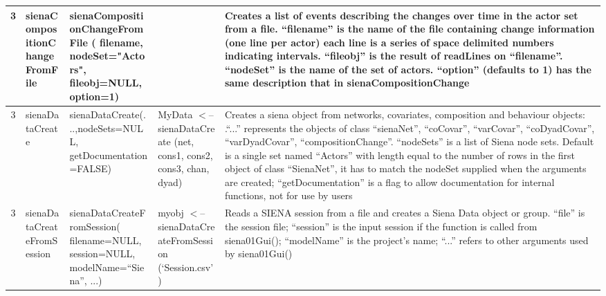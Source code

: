 \documentclass[a4paper,fleqn,11pt]{article}
\newcommand{\+}{\, + \,}
\begin{document}
{\begin{landscape}
\begin{small}
\begin{longtable}{c | p{2.4cm} | p{4.5cm} | p{4.0cm} | p{9.0cm} }
3 & sienaCompositionChangeFromFile & \newline
sienaCompositionChangeFromFile ( filename, \newline
nodeSet="Actors", \newline
fileobj=NULL, option=1) & & Creates a list of events
describing the changes over time in the actor set from a file. ``filename'' is
the name of the file containing change information (one line per actor) each
line is a series of space delimited numbers indicating intervals. ``fileobj''
is the result of readLines on ``filename''. ``nodeSet'' is the name of the set
of actors. ``option'' (defaults to 1) has the same
description that in  sienaCompositionChange\\
\hline

3 & sienaDataCreate & sienaDataCreate(...,\newline nodeSets=NULL, \newline
getDocumentation=FALSE) &
MyData $<$-- \newline
sienaDataCreate (net, \newline cons1, cons2, cons3, \newline
chan, dyad) & Creates a siena object from networks, covariates,
composition and behaviour objects: .``...''  represents the objects of class
``sienaNet'', ``coCovar'', ``varCovar'', ``coDyadCovar'', ``varDyadCovar'',
``compositionChange''. ``nodeSets'' is a list of Siena node sets. Default is a
single set named ``Actors'' with length equal to the number of rows in the
first object of class ``SienaNet'', it has to match the nodeSet supplied when
the arguments are created; ``getDocumentation'' is a flag to allow
documentation for internal functions,  not for use by users\\
\hline

3 & sienaDataCreateFromSession & \newline
sienaDataCreateFromSession( \newline
filename=NULL, \newline
session=NULL, \newline
modelName=``Siena'', ...) & myobj $<$-- \newline
sienaDataCreateFromSession  \newline
(`Session.csv') & Reads a SIENA session from a file and creates a
Siena Data object or group. ``file'' is the session file; ``session'' is the
input session if the function is called from siena01Gui(); ``modelName'' is the
project's name; ``...'' refers to other
arguments used by siena01Gui()\\
\hline


\end{longtable}
\end{small}
\end{landscape}}
\end{document}
